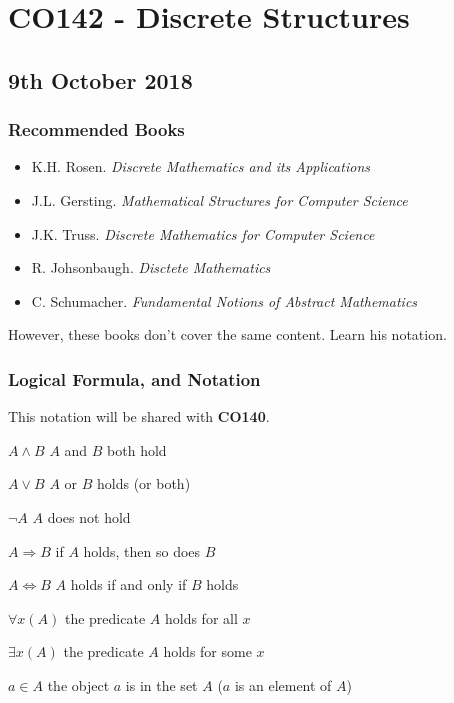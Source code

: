 \documentclass[a4paper, 12pt]{article}
\begin{document}
        \section*{CO142 - Discrete Structures}
        \subsection*{9th October 2018}
        \subsubsection*{Recommended Books}
        \begin{itemize}
            \item K.H. Rosen. \textit{Discrete Mathematics and its Applications}
            \item J.L. Gersting. \textit{Mathematical Structures for Computer Science}
            \item J.K. Truss. \textit{Discrete Mathematics for Computer Science}
            \item R. Johsonbaugh. \textit{Disctete Mathematics}
            \item C. Schumacher. \textit{Fundamental Notions of Abstract Mathematics}
        \end{itemize}
        However, these books don't cover the same content. Learn his notation.
        \subsubsection*{Logical Formula, and Notation}
        This notation will be shared with \textbf{CO140}.
        \medskip

        $A \land B$ \hfill $A$ and $B$ both hold
        \smallskip

        $A \lor B$ \hfill $A$ or $B$ holds (or both)
        \smallskip

        $\neg A$ \hfill $A$ does not hold
        \smallskip

        $A \Rightarrow B$ \hfill if $A$ holds, then so does $B$
        \smallskip

        $A \Leftrightarrow B$ \hfill $A$ holds if and only if $B$ holds
        \smallskip

        $\forall x (A)$ \hfill the predicate $A$ holds for all $x$
        \smallskip

        $\exists x (A)$ \hfill the predicate $A$ holds for some $x$
        \smallskip

        $a \in A$ \hfill the object $a$ is in the set $A$ ($a$ is an element of $A$)
        \smallskip
\end{document}
